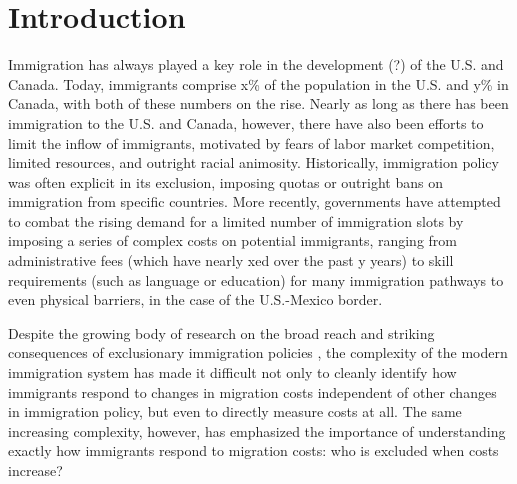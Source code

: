 \section{Introduction}


Immigration has always played a key role in the development (?) of the U.S. and Canada. Today, immigrants comprise x\% of the population in the U.S. and y\% in Canada, with both of these numbers on the rise. Nearly as long as there has been immigration to the U.S. and Canada, however, there have also been efforts to limit the inflow of immigrants, motivated by fears of labor market competition, limited resources, and outright racial animosity. Historically, immigration policy was often explicit in its exclusion, imposing quotas or outright bans on immigration from specific countries. More recently, governments have attempted to combat the rising demand for a limited number of immigration slots by imposing a series of complex costs on potential immigrants, ranging from administrative fees (which have nearly xed over the past y years) to skill requirements (such as language or education) for many immigration pathways to even physical barriers, in the case of the U.S.-Mexico border.

Despite the growing body of research on the broad reach and striking consequences of exclusionary immigration policies \citep{clemensetal2018,ChenXie2020,feigenberg2020,Abramitzkyetal2023}, the complexity of the modern immigration system has made it difficult not only to cleanly identify how immigrants respond to changes in migration costs independent of other changes in immigration policy, but even to directly measure costs at all. The same increasing complexity, however, has emphasized the importance of understanding exactly how immigrants respond to migration costs: who is excluded when costs increase?



